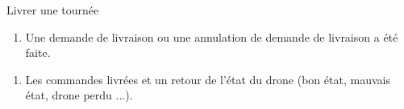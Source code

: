 ﻿\begin{UseCase}{Livrer une tournée}



\begin{UseCasePre}
    \begin{enumerate}
        \item Une demande de livraison ou une annulation de demande de livraison a été faite.
    \end{enumerate}
\end{UseCasePre}

\begin{UseCasePost}
    \begin{enumerate}
        \item Les commandes livrées et un retour de l'état du drone (bon état,
            mauvais état, drone perdu ...).
    \end{enumerate}
\end{UseCasePost}


\end{UseCase}
